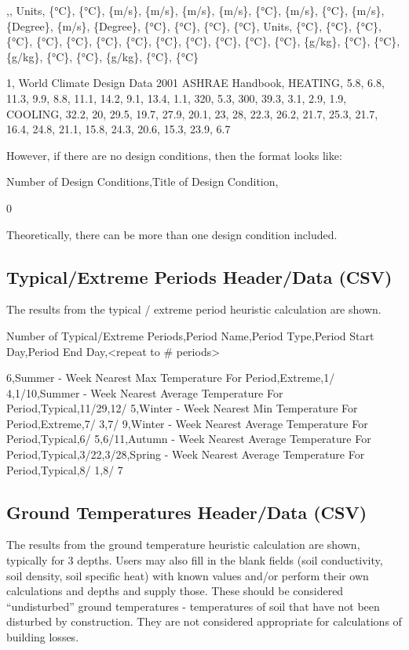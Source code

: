 ,, Units, \{°C\}, \{°C\}, \{m/s\}, \{m/s\}, \{m/s\}, \{m/s\}, \{°C\}, \{m/s\}, \{°C\}, \{m/s\}, \{Degree\}, \{m/s\}, \{Degree\}, \{°C\}, \{°C\}, \{°C\}, \{°C\}, Units, \{°C\}, \{°C\}, \{°C\}, \{°C\}, \{°C\}, \{°C\}, \{°C\}, \{°C\}, \{°C\}, \{°C\}, \{°C\}, \{°C\}, \{°C\}, \{g/kg\}, \{°C\}, \{°C\}, \{g/kg\}, \{°C\}, \{°C\}, \{g/kg\}, \{°C\}, \{°C\}

1, World Climate Design Data 2001 ASHRAE Handbook, HEATING, 5.8, 6.8, 11.3, 9.9, 8.8, 11.1, 14.2, 9.1, 13.4, 1.1, 320, 5.3, 300, 39.3, 3.1, 2.9, 1.9, COOLING, 32.2, 20, 29.5, 19.7, 27.9, 20.1, 23, 28, 22.3, 26.2, 21.7, 25.3, 21.7, 16.4, 24.8, 21.1, 15.8, 24.3, 20.6, 15.3, 23.9, 6.7 

However, if there are no design conditions, then the format looks like:

Number of Design Conditions,Title of Design Condition,

0

Theoretically, there can be more than one design condition included.

\subsection{Typical/Extreme Periods Header/Data (CSV)}\label{typicalextreme-periods-headerdata-csv}

The results from the typical / extreme period heuristic calculation are shown.

Number of Typical/Extreme Periods,Period Name,Period Type,Period Start Day,Period End Day,\textless{}repeat to \# periods\textgreater{}

6,Summer - Week Nearest Max Temperature For Period,Extreme,1/ 4,1/10,Summer - Week Nearest Average Temperature For Period,Typical,11/29,12/ 5,Winter - Week Nearest Min Temperature For Period,Extreme,7/ 3,7/ 9,Winter - Week Nearest Average Temperature For Period,Typical,6/ 5,6/11,Autumn - Week Nearest Average Temperature For Period,Typical,3/22,3/28,Spring - Week Nearest Average Temperature For Period,Typical,8/ 1,8/ 7

\subsection{Ground Temperatures Header/Data (CSV)}\label{ground-temperatures-headerdata-csv}

The results from the ground temperature heuristic calculation are shown, typically for 3 depths. Users may also fill in the blank fields (soil conductivity, soil density, soil specific heat) with known values and/or perform their own calculations and depths and supply those. These should be considered ``undisturbed'' ground temperatures - temperatures of soil that have not been disturbed by construction. They are not considered appropriate for calculations of building losses.

